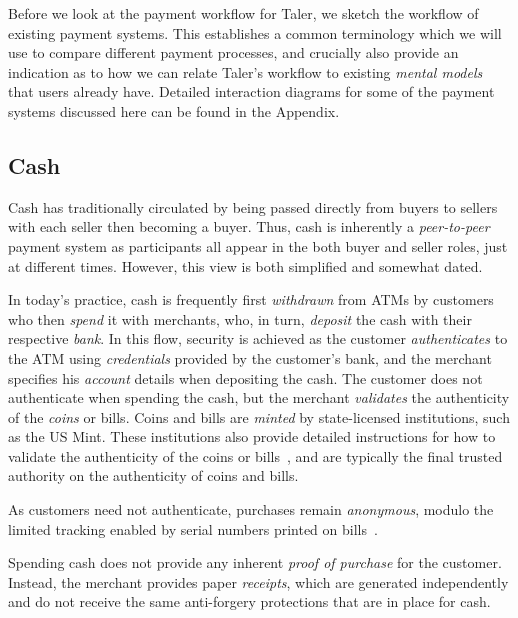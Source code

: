 \documentclass{IEEEtran}
\begin{document}
Before we look at the payment workflow for Taler, we sketch the
workflow of existing payment systems. This establishes a common
terminology which we will use to compare different payment processes,
and crucially also provide an indication as to how we can relate
Taler's workflow to existing {\em mental models} that users already
have.  Detailed interaction diagrams for some of the payment systems
discussed here can be found in the Appendix.

\subsection{Cash}

Cash has traditionally circulated by being passed directly from buyers
to sellers with each seller then becoming a buyer. Thus, cash is
inherently a {\em peer-to-peer} payment system as participants all
appear in the both buyer and seller roles, just at different times.
However, this view is both simplified and
somewhat dated.

In today's practice, cash is frequently first {\em withdrawn} from
ATMs by customers who then {\em spend} it with merchants, who, in turn,
{\em deposit} the cash with their respective {\em bank}.  In this
flow, security is achieved as the customer {\em authenticates} to the
ATM using {\em credentials} provided by the customer's bank, and the
merchant specifies his {\em account} details when depositing the cash.
The customer does not authenticate when spending the cash, but the
merchant {\em validates} the authenticity of the {\em coins} or bills.
Coins and bills are {\em minted} by state-licensed institutions, such
as the US Mint.  These institutions also provide detailed instructions
for how to validate the authenticity of the coins or
bills~\cite{ezb2016ourmoney}, and are typically the final trusted
authority on the authenticity of coins and bills.

As customers need not authenticate, purchases remain {\em
anonymous}, modulo the limited tracking enabled by serial numbers
printed on bills~\cite{pets2004kuegler}.

Spending cash does not provide any inherent {\em proof of purchase}
for the customer. Instead, the merchant provides paper
{\em receipts}, which are generated independently and do not receive
the same anti-forgery protections that are in place for cash.
\end{document}
